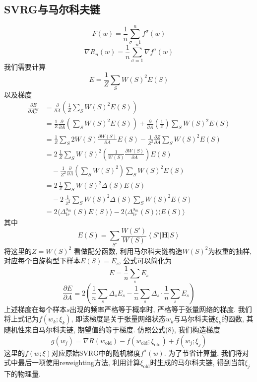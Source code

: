 \documentclass{article}
\newcommand{\bra}[1]{\left\langle #1\right\rvert}
\newcommand{\ket}[1]{\left\lvert #1\right\rangle}
\begin{document}
\subsection*{SVRG与马尔科夫链}
\[F(w)=\frac{1}{n}\sum_{\sigma=1}^n f^\sigma(w)\]
\[\nabla R_n(w)=\frac1n\sum_{\sigma=1}^n \nabla f^\sigma(w)\]
\noindent
我们需要计算
\[
    E = \frac{1}{Z}\sum_S W\!(S)^2 E(S)
\]
以及梯度
\begin{align*}
    \frac{\partial E}{\partial A^{s_m}_{lr}} &= \frac{\partial}{\partial A}\left(\frac{1}{Z}\sum_S W\!(S)^2 E(S)\right)\\
            &= \frac{1}{Z} \frac{\partial}{\partial A} \left(\sum_S W\!(S)^2 E(S)\right) + \frac{\partial}{\partial A}\!\left(\frac{1}{Z}\right)\sum_S W\!(S)^2 E(S)\\
            &= \frac{1}{Z} \sum_S 2W\!(S)\frac{\partial W\!(S)}{\partial A} E(S) - \frac{1}{Z^2}\frac{\partial Z}{\partial A} \sum_S W\!(S)^2 E(S)\\
            &= 2\,\frac{1}{Z}\!\sum_S W\!(S)^2\left(\frac{1}{W\!(S)}\frac{\partial W\!(S)}{\partial A}\right) E(S) \\
                &\quad - \frac{1}{Z^2}\frac{\partial}{\partial A}\left(\sum_S W\!(S)^2\right) \sum_S W\!(S)^2 E(S)\\
            &= 2\,\frac{1}{Z}\!\sum_S W\!(S)^2\Delta(S) E(S) \\
            &\quad - 2\,\frac{1}{Z^2}\! \sum_S W\!(S)^2\Delta(S) \sum_S W\!(S)^2 E(S)\\
            &= 2\langle{\Delta}^{s_m}_{lr}(S)E(S)\rangle -  2\langle{\Delta}^{s_m}_{lr}(S)\rangle\langle E(S)\rangle
\end{align*}
其中
\[
    E(S) = \sum_{S'}\frac{W\!(S')}{W\!(S)}\bra{S'}\mathbf{H}\ket{S}
\]
将这里的$Z=W(S)^2$ 看做配分函数,
利用马尔科夫链构造$W(S)^2$为权重的抽样, 对应每个自旋构型下样本$E(S)=E_s$, 公式可以简化为
\[
    E = \frac{1}{n}\sum_s E_s
\]
\[
    \frac{\partial E}{\partial A} = 2\left(\frac{1}{n}\sum_s \Delta_s E_s -\frac{1}{n}\sum_s \Delta_s\cdot\frac{1}{n}\sum_s E_s\right)
\]
上述梯度在每个样本$s$出现的频率严格等于概率时, 严格等于张量网络的梯度. 我们将上式记为$f(w_k; \xi_k)$, 即该梯度是关于张量网络状态$w_k$与马尔科夫链$\xi_k$的函数, 其随机性来自马尔科夫链, 期望值约等于梯度.
仿照公式(8), 我们构造梯度
\begin{equation}
    g(w_j) = \nabla R(w_\text{old}) - f(w_\text{old}; \xi_\text{old}) + f(w_j; \xi_j)
\end{equation}
这里的$f(w; \xi)$对应原始SVRG中的随机梯度$f^{\sigma}(w)$. 为了节省计算量, 我们将对式中最后一项使用reweighting方法, 利用计算$\xi_\text{old}$时生成的马尔科夫链, 得到当前$\xi_j$下的物理量.
\end{document}
